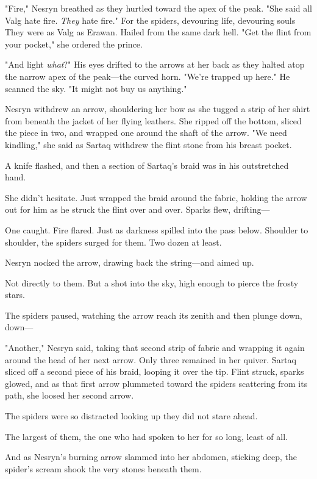 "Fire," Nesryn breathed as they hurtled toward the apex of the peak. "She said all Valg hate fire. \emph{They} hate fire." For the spiders, devouring life, devouring souls  They were as Valg as Erawan. Hailed from the same dark hell. "Get the flint from your pocket," she ordered the prince.

"And light \emph{what}?" His eyes drifted to the arrows at her back as they halted atop the narrow apex of the peak---the curved horn. "We're trapped up here." He scanned the sky. "It might not buy us anything."

Nesryn withdrew an arrow, shouldering her bow as she tugged a strip of her shirt from beneath the jacket of her flying leathers. She ripped off the bottom, sliced the piece in two, and wrapped one around the shaft of the arrow. "We need kindling," she said as Sartaq withdrew the flint stone from his breast pocket.

A knife flashed, and then a section of Sartaq's braid was in his outstretched hand.

She didn't hesitate. Just wrapped the braid around the fabric, holding the arrow out for him as he struck the flint over and over. Sparks flew, drifting---

One caught. Fire flared. Just as darkness spilled into the pass below. Shoulder to shoulder, the spiders surged for them. Two dozen at least.

Nesryn nocked the arrow, drawing back the string---and aimed up.

Not directly to them. But a shot into the sky, high enough to pierce the frosty stars.

The spiders paused, watching the arrow reach its zenith and then plunge down, down---

"Another," Nesryn said, taking that second strip of fabric and wrapping it again around the head of her next arrow. Only three remained in her quiver. Sartaq sliced off a second piece of his braid, looping it over the tip. Flint struck, sparks glowed, and as that first arrow plummeted toward the spiders scattering from its path, she loosed her second arrow.

The spiders were so distracted looking up they did not stare ahead.

The largest of them, the one who had spoken to her for so long, least of all.

And as Nesryn's burning arrow slammed into her abdomen, sticking deep, the spider's scream shook the very stones beneath them.

